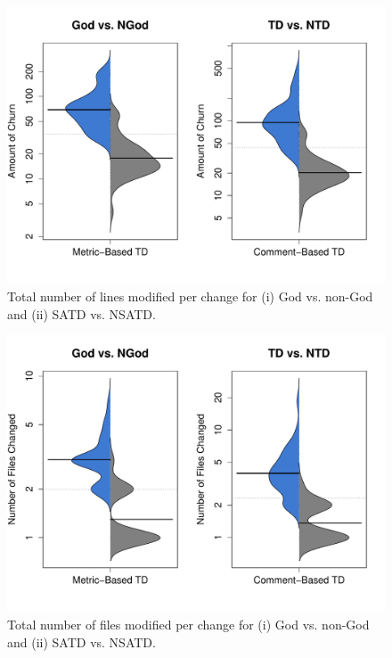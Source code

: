 {\begin{figure}[!hp]
	\centering
	\includegraphics[width=120mm]{figures/chapter4/rq3_churn}
	\caption{Total number of lines modified per change for (i) God vs. non-God and (ii) SATD vs. NSATD.}
	\label{figure:ch4_tlcpc}
\end{figure}



\begin{figure}[!hp]
	\centering
	\includegraphics[width=120mm]{figures/chapter4/rq3_nf}
	\caption{Total number of files modified per change for (i) God vs. non-God and (ii) SATD vs. NSATD.}
	\label{figure:ch4_tfcpc}
\end{figure}

}
